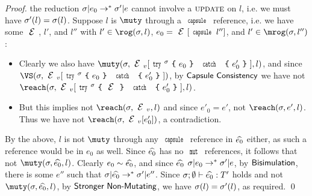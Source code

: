 \begin{proof}
	the reduction $\sigma|e_0\rightarrow^*\sigma'|e$ cannot involve a $\textsc{update}$
	on $l$, i.e. we must have $\sigma'(l) = \sigma(l)$.
	Suppose $l$ is $\muty$ through a $\Kw{capsule}$ reference, i.e. we have
	some $\E$, $l'$, and $l''$ with $l'\in\rog(\s,l)$, $e_0 = \E[\Kw{capsule}\,l'']$,
	and $l'\in\mrog(\s,l'')$:
	\begin{itemize}
		\item Clearly we also have $\muty(\s,\EV[\trys{\s}{e_0}{e'_0}],l)$,
		and since $\VS(\s,\EV[\trys{\s}{e_0}{e'_0}])$, by $\textsf{Capsule Consistency}$
		we have not $\reach(\s,\EV[\trys{\s}{\E}{e'_0}],l)$.
		\item But this implies not $\reach(\s,\EV,l)$ and since $e'_0 = e'$,
		not $\reach(\s,e',l)$. Thus we have not $\reach(\s,\EV[e'_0])$,
		a contradiction.
	\end{itemize}
	By the above, $l$ is not $\muty$ through any $\Kw{capsule}$ reference
	in $\widehat{e_0}$ either, as such a reference would be in $e_0$
	as well.
	Since $\widehat{e_0}$ has no $\Kw{mut}$ references, it follows that
	not $\muty(\s,\demut{e_0},l)$.
	Clearly $e_0\sim\widehat{e_0}$, and since $\widehat{e_0}$ $\sigma|e_0\rightarrow^*\sigma'|e$,
	by $\textsf{Bisimulation}$, there is some $e''$ such that $\sigma|\widehat{e_0}\rightarrow^*\sigma'|e''$.
	Since $\tyr{\demut{e_0}}{T'}$ holds and not $\muty(\s,\demut{e_0},l)$,
	by $\textsf{Stronger Non-Mutating}$, we have $\sigma(l) = \sigma'(l)$, as
	required.
\qed\end{proof}

\lstset{language=FortyThree} %